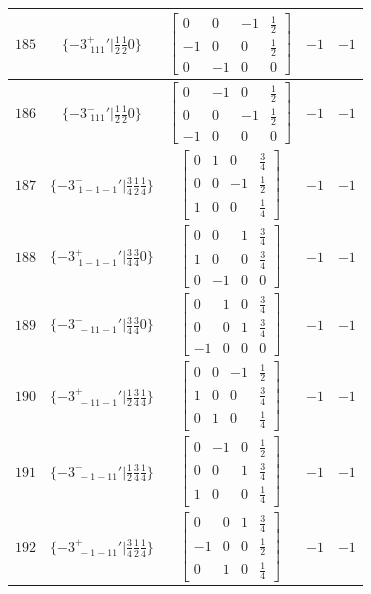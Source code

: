 \documentclass[fleqn,8pt]{jsarticle}
\begin{document}
\begin{longtable}{ccccc}
$ 185 $ & $ \{-3^{+}_{\,\,111}{}'|\frac{1}{2} \frac{1}{2} 0\} $ & $ \begin{bmatrix} 0 & 0 & -1 & \frac{1}{2} \\ -1 & 0 & 0 & \frac{1}{2} \\ 0 & -1 & 0 & 0 \end{bmatrix} $ & $ -1 $ & $ -1 $ \\ \hline
$ 186 $ & $ \{-3^{-}_{\,\,111}{}'|\frac{1}{2} \frac{1}{2} 0\} $ & $ \begin{bmatrix} 0 & -1 & 0 & \frac{1}{2} \\ 0 & 0 & -1 & \frac{1}{2} \\ -1 & 0 & 0 & 0 \end{bmatrix} $ & $ -1 $ & $ -1 $ \\ \hline
$ 187 $ & $ \{-3^{-}_{\,\,1-1-1}{}'|\frac{3}{4} \frac{1}{2} \frac{1}{4}\} $ & $ \begin{bmatrix} 0 & 1 & 0 & \frac{3}{4} \\ 0 & 0 & -1 & \frac{1}{2} \\ 1 & 0 & 0 & \frac{1}{4} \end{bmatrix} $ & $ -1 $ & $ -1 $ \\ \hline
$ 188 $ & $ \{-3^{+}_{\,\,1-1-1}{}'|\frac{3}{4} \frac{3}{4} 0\} $ & $ \begin{bmatrix} 0 & 0 & 1 & \frac{3}{4} \\ 1 & 0 & 0 & \frac{3}{4} \\ 0 & -1 & 0 & 0 \end{bmatrix} $ & $ -1 $ & $ -1 $ \\ \hline
$ 189 $ & $ \{-3^{-}_{\,\,-11-1}{}'|\frac{3}{4} \frac{3}{4} 0\} $ & $ \begin{bmatrix} 0 & 1 & 0 & \frac{3}{4} \\ 0 & 0 & 1 & \frac{3}{4} \\ -1 & 0 & 0 & 0 \end{bmatrix} $ & $ -1 $ & $ -1 $ \\ \hline
$ 190 $ & $ \{-3^{+}_{\,\,-11-1}{}'|\frac{1}{2} \frac{3}{4} \frac{1}{4}\} $ & $ \begin{bmatrix} 0 & 0 & -1 & \frac{1}{2} \\ 1 & 0 & 0 & \frac{3}{4} \\ 0 & 1 & 0 & \frac{1}{4} \end{bmatrix} $ & $ -1 $ & $ -1 $ \\ \hline
$ 191 $ & $ \{-3^{-}_{\,\,-1-11}{}'|\frac{1}{2} \frac{3}{4} \frac{1}{4}\} $ & $ \begin{bmatrix} 0 & -1 & 0 & \frac{1}{2} \\ 0 & 0 & 1 & \frac{3}{4} \\ 1 & 0 & 0 & \frac{1}{4} \end{bmatrix} $ & $ -1 $ & $ -1 $ \\ \hline
$ 192 $ & $ \{-3^{+}_{\,\,-1-11}{}'|\frac{3}{4} \frac{1}{2} \frac{1}{4}\} $ & $ \begin{bmatrix} 0 & 0 & 1 & \frac{3}{4} \\ -1 & 0 & 0 & \frac{1}{2} \\ 0 & 1 & 0 & \frac{1}{4} \end{bmatrix} $ & $ -1 $ & $ -1 $ \\
\end{longtable}
\end{document}
